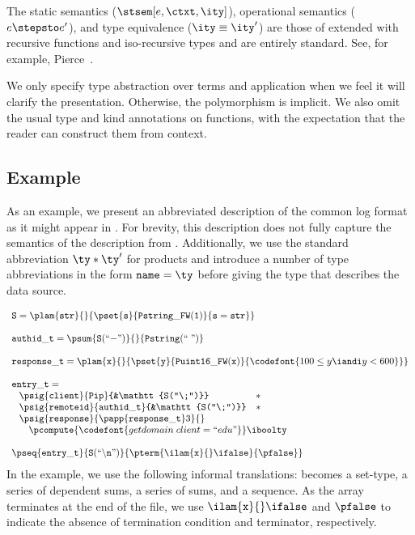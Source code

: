 The static semantics ($\stsem[e,\ctxt,\ity]$), operational
semantics ($e \stepsto e'$), and type 
equivalence ($\ity \equiv \ity'$) are those of \fomega{} extended with
recursive functions and iso-recursive types and are entirely standard.
See, for example, Pierce~\cite{pierce:tapl}.

We only specify type
abstraction over terms and application when we feel it will clarify
the presentation. Otherwise, the polymorphism is implicit.  We also
omit the usual type and kind annotations on functions, with the
expectation that the reader can construct them from context.  

\subsection{Example}
\label{sec:ddc-example}

As an example, we present an abbreviated description of the common log
format as it might appear in \ddc{}. For brevity,
this description does not fully capture the semantics of the
\ipads{} description from . Additionally, we
use the standard abbreviation $\ty * \ty'$ for products and introduce a number of type abbreviations
in the form $\mathtt{name} = \ty$ before giving the type that describes the data source.

{\small
\[
\begin{array}{l}
\mathtt{S} = \plam {\mathtt{str}} {} {\pset {\mathtt{s}}
  {\mathtt{Pstring\_FW(1)}} {\mathtt{s = str}}}\\
\\
\mathtt{authid\_t} = 
\psum {\mathtt{S(``{-}")}} {} {\mathtt{Pstring(``\;")}}\\
\\
\mathtt{response\_t} = \plam {\mathtt x} {} {
      \pset {\mathtt y} {\mathtt{Puint16\_FW(x)}} 
      {\codefont{100 \leq y \iandi y < 600}}
    }\\
\\
\mathtt{entry\_t} = \\ \;
\begin{array}{lll}
\psig {\mathtt{client}} {\mathtt{Pip}} {&\mathtt{S(``\;")}} &* \\
\psig {\mathtt{remoteid}} {\mathtt{authid\_t}} {&\mathtt{S(``\;")}} &* \\
\psig {\mathtt{response}} {
  \papp
    {\mathtt{response\_t}} 3
}{} \\
\multicolumn{3}{c}{
\quad \pcompute {\codefont{getdomain\;client = ``edu"}} \iboolty}
\end{array}\\
\\
\pseq {\mathtt{entry\_t}} {\mathtt{S(``\backslash n")}}{
  \pterm {\ilam {\mathtt x} {} \ifalse} {\pfalse}
}
\end{array}
\]}%
\noindent
In the example, we use the following
informal translations: \Pwhere{} becomes a set-type, \Pstruct{} a
series of dependent sums, \Punion{} a series of sums, and
\Parray{} a sequence.  As the array terminates at the end of the file, we
use $\ilam {\mathtt x} {} \ifalse$ and $\pfalse$ to indicate the
absence of termination condition and terminator, respectively.

